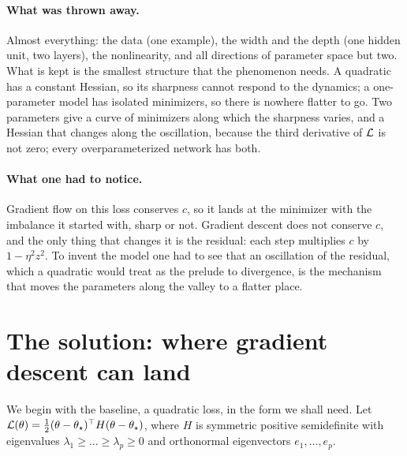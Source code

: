 \begin{refsection}
\paragraph{What was thrown away.} Almost everything: the data (one example), the width and the depth (one hidden unit, two layers), the nonlinearity, and all directions of parameter space but two. What is kept is the smallest structure that the phenomenon needs. A quadratic has a constant Hessian, so its sharpness cannot respond to the dynamics; a one-parameter model has isolated minimizers, so there is nowhere flatter to go. Two parameters give a curve of minimizers along which the sharpness varies, and a Hessian that changes along the oscillation, because the third derivative of $\mathcal{L}$ is not zero; every overparameterized network has both.

\paragraph{What one had to notice.} Gradient flow on this loss conserves $c$, so it lands at the minimizer with the imbalance it started with, sharp or not. Gradient descent does not conserve $c$, and the only thing that changes it is the residual: each step multiplies $c$ by $1-\eta^2z^2$. To invent the model one had to see that an oscillation of the residual, which a quadratic would treat as the prelude to divergence, is the mechanism that moves the parameters along the valley to a flatter place.

\section{The solution: where gradient descent can land}\label{sec:stability:landing}

We begin with the baseline, a quadratic loss, in the form we shall need. Let $\mathcal{L}(\theta)=\frac12(\theta-\theta_\star)^\top H(\theta-\theta_\star)$, where $H$ is symmetric positive semidefinite with eigenvalues $\lambda_1\ge\dots\ge\lambda_p\ge0$ and orthonormal eigenvectors $e_1,\dots,e_p$.



\end{refsection}
